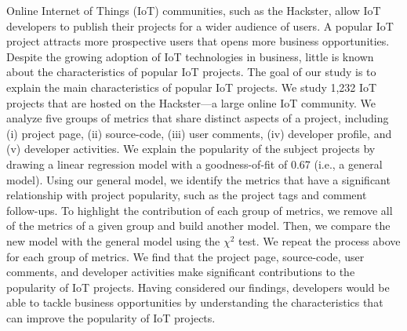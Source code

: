 \begin{comment}
\end{comment}
Online Internet of Things (IoT) communities, such as the Hackster, allow IoT
developers to publish their projects for a wider audience of users. A popular IoT project
attracts more prospective users that opens more business opportunities. Despite
the growing adoption of IoT technologies in business, little is known about the
characteristics of popular IoT projects. The goal of our study is to explain
the main characteristics of popular IoT projects. We study 1,232 IoT projects
that are hosted on the Hackster---a large online IoT community. We analyze five
groups of metrics that share distinct aspects of a project, including (i)
project page, (ii) source-code, (iii) user comments, (iv) developer profile,
and (v) developer activities. We explain the popularity of the subject projects
by drawing a linear regression model with a goodness-of-fit of 0.67 (i.e., a
general model). Using our general model, we identify the metrics that have a
significant relationship with project popularity, such as the project tags and
comment follow-ups. To highlight the contribution of each group of metrics, we
remove all of the metrics of a given group and build another model. Then, we
compare the new model with the general model using the $\chi^2$ test. We repeat
the process above for each group of metrics. We find that the project page,
source-code, user comments, and developer activities make significant
contributions to the popularity of IoT projects. Having considered our
findings, developers would be able to tackle business opportunities by
understanding the characteristics that can improve the popularity of IoT
projects.

